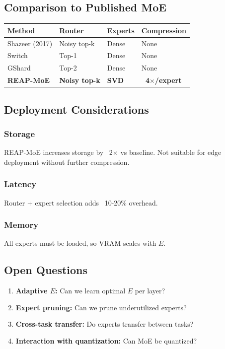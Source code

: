 \subsection{Comparison to Published MoE}

\begin{table}[H]
\centering
\small
\begin{tabular}{llll}
\toprule
\textbf{Method} & \textbf{Router} & \textbf{Experts} & \textbf{Compression} \\
\midrule
Shazeer (2017) & Noisy top-k & Dense & None \\
Switch & Top-1 & Dense & None \\
GShard & Top-2 & Dense & None \\
\textbf{REAP-MoE} & \textbf{Noisy top-k} & \textbf{SVD} & \textbf{~4$\times$/expert} \\
\bottomrule
\end{tabular}
\end{table}

\subsection{Deployment Considerations}

\subsubsection{Storage}
REAP-MoE increases storage by ~2$\times$ vs baseline. Not suitable for edge 
deployment without further compression.

\subsubsection{Latency}
Router + expert selection adds ~10-20\% overhead.

\subsubsection{Memory}
All experts must be loaded, so VRAM scales with $E$.

\subsection{Open Questions}

\begin{enumerate}
\item \textbf{Adaptive $E$:} Can we learn optimal $E$ per layer?
\item \textbf{Expert pruning:} Can we prune underutilized experts?
\item \textbf{Cross-task transfer:} Do experts transfer between tasks?
\item \textbf{Interaction with quantization:} Can MoE be quantized?

\end{enumerate}
